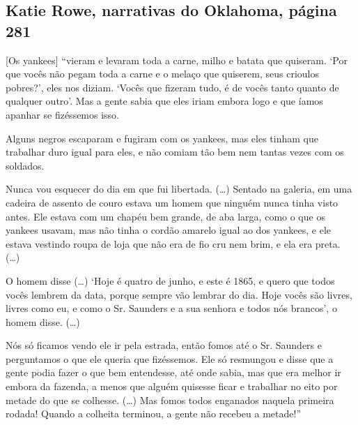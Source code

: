 \subsection{Katie Rowe, narrativas do Oklahoma, página 281}
\label{ref233}

{[}Os yankees{]} ``vieram e levaram toda a carne, milho e batata que
quiseram. `Por que vocês não pegam toda a carne e o melaço que quiserem,
seus crioulos pobres?', eles nos diziam. `Vocês que fizeram tudo, é de
vocês tanto quanto de qualquer outro'. Mas a gente sabia que eles iriam
embora logo e que íamos apanhar se fizéssemos isso.

Alguns negros escaparam e fugiram com os yankees, mas eles tinham que
trabalhar duro igual para eles, e não comiam tão bem nem tantas vezes
com os soldados.

Nunca vou esquecer do dia em que fui libertada. (\ldots{}) Sentado na
galeria, em uma cadeira de assento de couro estava um homem que ninguém
nunca tinha visto antes. Ele estava com um chapéu bem grande, de aba
larga, como o que os yankees usavam, mas não tinha o cordão amarelo
igual ao dos yankees, e ele estava vestindo roupa de loja que não era de
fio cru nem brim, e ela era preta. (\ldots{})

O homem disse (\ldots{}) `Hoje é quatro de junho, e este é 1865, e quero
que todos vocês lembrem da data, porque sempre vão lembrar do dia. Hoje
vocês são livres, livres como eu, e como o Sr. Saunders e a sua senhora
e todos nós brancos', o homem disse. (\ldots{})

Nós só ficamos vendo ele ir pela estrada, então fomos até o Sr. Saunders
e perguntamos o que ele queria que fizéssemos. Ele só resmungou e disse
que a gente podia fazer o que bem entendesse, até onde sabia, mas que
era melhor ir embora da fazenda, a menos que alguém quisesse ficar e
trabalhar no eito por metade do que se colhesse. (\ldots{}) Mas fomos
todos enganados naquela primeira rodada! Quando a colheita terminou, a
gente não recebeu a metade!''

